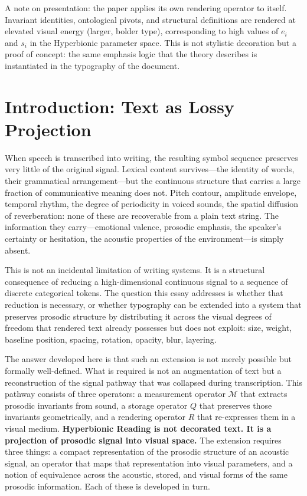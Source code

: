 \documentclass[12pt, a4paper]{article}
\newcommand{\hyperstrong}[1]{\textbf{\Large #1}}
\begin{document}
A note on presentation: the paper applies its own rendering operator to itself. Invariant identities, ontological pivots, and structural definitions are rendered at elevated visual energy (larger, bolder type), corresponding to high values of $e_i$ and $s_i$ in the Hyperbionic parameter space. This is not stylistic decoration but a proof of concept: the same emphasis logic that the theory describes is instantiated in the typography of the document.

\section{Introduction: Text as Lossy Projection}

When speech is transcribed into writing, the resulting symbol sequence preserves very little of the original signal. Lexical content survives---the identity of words, their grammatical arrangement---but the continuous structure that carries a large fraction of communicative meaning does not. Pitch contour, amplitude envelope, temporal rhythm, the degree of periodicity in voiced sounds, the spatial diffusion of reverberation: none of these are recoverable from a plain text string. The information they carry---emotional valence, prosodic emphasis, the speaker's certainty or hesitation, the acoustic properties of the environment---is simply absent.

This is not an incidental limitation of writing systems. It is a structural consequence of reducing a high-dimensional continuous signal to a sequence of discrete categorical tokens. The question this essay addresses is whether that reduction is necessary, or whether typography can be extended into a system that preserves prosodic structure by distributing it across the visual degrees of freedom that rendered text already possesses but does not exploit: size, weight, baseline position, spacing, rotation, opacity, blur, layering.

The answer developed here is that such an extension is not merely possible but formally well-defined. What is required is not an augmentation of text but a reconstruction of the signal pathway that was collapsed during transcription. This pathway consists of three operators: a measurement operator $\mathcal{M}$ that extracts prosodic invariants from sound, a storage operator $Q$ that preserves those invariants geometrically, and a rendering operator $R$ that re-expresses them in a visual medium. \hyperstrong{Hyperbionic Reading is not decorated text. It is a projection of prosodic signal into visual space.} The extension requires three things: a compact representation of the prosodic structure of an acoustic signal, an operator that maps that representation into visual parameters, and a notion of equivalence across the acoustic, stored, and visual forms of the same prosodic information. Each of these is developed in turn.
\end{document}
